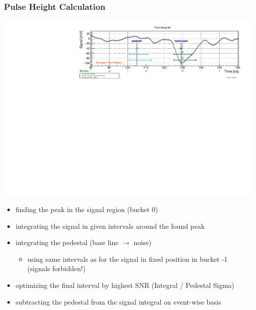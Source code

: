 \documentclass[9pt]{beamer}
\begin{document}
\begin{frame}
	\frametitle{Pulse Height Calculation}
	\begin{center}
		\includegraphics[angle=270, width=.8\textwidth]{IntegralPeaks}\\
	\end{center}
	\begin{itemize}
		\setlength{\itemsep}{\fill}
		\item finding the peak in the signal region (bucket 0)
		\item integrating the signal in given intervals around the found peak
		\item integrating the pedestal (base line $\rightarrow$ noise)
		\begin{itemize}
			\item using same intervals as for the signal in fixed position in bucket -1 (signals forbidden!)
		\end{itemize}
		\item optimizing the final interval by highest SNR (Integral / Pedestal Sigma)
		\item subtracting the pedestal from the signal integral on event-wise basis 
	\end{itemize}
\end{frame}
\end{document}
